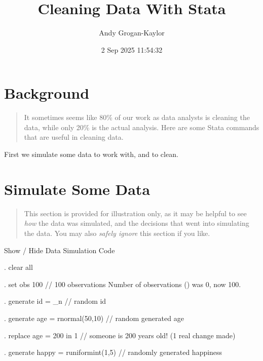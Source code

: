 \documentclass[
]{article}
\title{Cleaning Data With Stata}
\author{Andy Grogan-Kaylor}
\date{2 Sep 2025 11:54:32}
\begin{document}
\maketitle

\section{Background}\label{background}

\begin{quote}
It sometimes seems like 80\% of our work as data analysts is cleaning
the data, while only 20\% is the actual analysis. Here are some Stata
commands that are useful in cleaning data.
\end{quote}

First we simulate some data to work with, and to clean.

\section{Simulate Some Data}\label{simulate-some-data}

\begin{quote}
This section is provided for illustration only, as it may be helpful to
see \emph{how} the data was simulated, and the decisions that went into
simulating the data. You may also \emph{safely ignore} this section if
you like.
\end{quote}

Show / Hide Data Simulation Code

\begin{stlog}
. clear all 
\end{stlog}

\begin{stlog}
. set obs 100 // 100 observations
Number of observations ({}) was 0, now 100.
\end{stlog}

\begin{stlog}
. generate id = _n // random id 
\end{stlog}

\begin{stlog}
. generate age = rnormal(50,10) // random generated age
\end{stlog}

\begin{stlog}
. replace age = 200 in 1 // someone is 200 years old!
(1 real change made)
\end{stlog}

\begin{stlog}
. generate happy = runiformint(1,5) // randomly generated happiness
\end{stlog}
\end{document}
